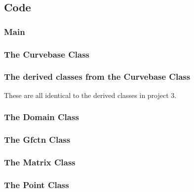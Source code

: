 \documentclass[a4paper,10pt]{article}
\begin{document}
\newpage
\subsection*{Code}
\subsubsection*{Main}

\subsubsection*{The Curvebase Class}


\subsubsection*{The derived classes from the Curvebase Class}
These are all identical to the derived classes in project 3.
%
%
%
%
%
%
\subsubsection*{The Domain Class}



\subsubsection*{The Gfctn Class}



\subsubsection*{The Matrix Class}



\subsubsection*{The Point Class}


\end{document}
